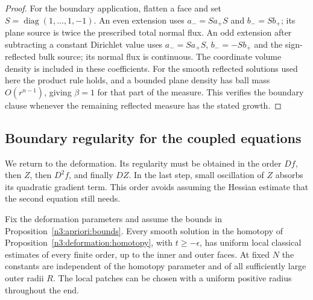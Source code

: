 \begin{proof}
For the boundary application, flatten a face and set
$S=\operatorname{diag}(1,\ldots,1,-1)$. An even extension uses
$a_-=Sa_+S$ and $b_-=Sb_+$; its plane source is twice the
prescribed total normal flux. An odd extension after subtracting a
constant Dirichlet value uses $a_-=Sa_+S$, $b_-=-Sb_+$ and the
sign-reflected bulk source; its normal flux is continuous.
The coordinate volume density is included in these coefficients.
For the smooth reflected solutions used here the product rule holds,
and a bounded plane density has ball mass $O(r^{n-1})$, giving
$\beta=1$ for that part of the measure. This verifies the boundary
clause whenever the remaining reflected measure has the stated growth.
\end{proof}

\subsection{Boundary regularity for the coupled equations}

We return to the deformation. Its regularity must be obtained in
the order $Df$, then $Z$, then $D^2f$, and finally $DZ$. In the
last step, small oscillation of $Z$ absorbs its quadratic gradient
term. This order avoids assuming the Hessian estimate that the
second equation still needs.

\begin{proposition}
\label{n3:existence:classical-bounds}
Fix the deformation parameters and assume the bounds in
Proposition~\ref{n3:apriori:bounds}.  Every smooth solution in the
homotopy of Proposition~\ref{n3:deformation:homotopy}, with
$t\ge-\epsilon$, has uniform local classical estimates of every
finite order, up to the inner and outer faces.  At fixed $N$ the
constants are independent of the homotopy parameter and of all
sufficiently large outer radii $R$.  The local patches can be chosen
with a uniform positive radius throughout the end.
\end{proposition}


